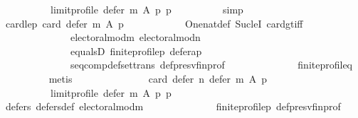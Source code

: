 \begin{isabellebody}
\ \ \ \ \ \ \ \ \ \ {\isacharparenleft}{\kern0pt}limit{\isacharunderscore}{\kern0pt}profile\ {\isacharparenleft}{\kern0pt}defer\ m\ A\ p{\isacharparenright}{\kern0pt}\ p{\isacharparenright}{\kern0pt}{\isachardoublequoteclose}\isanewline
\ \ \ \ \ \ \ \ \isamarkupfalse%
\ simp\isanewline
\ \ \ \ \ \ \isamarkupfalse%
\ card{\isacharunderscore}{\kern0pt}le{\isacharunderscore}{\kern0pt}{}{\isacharunderscore}{\kern0pt}p{\isacharcolon}{\kern0pt}\ {\isachardoublequoteopen}card\ {\isacharparenleft}{\kern0pt}defer\ m\ A\ p{\isacharparenright}{\kern0pt}\ {\isasymge}\ {}{\isachardoublequoteclose}\isanewline
\ \ \ \ \ \ \ \ \isamarkupfalse%
\ One{\isacharunderscore}{\kern0pt}nat{\isacharunderscore}{\kern0pt}def\ Suc{\isacharunderscore}{\kern0pt}leI\ card{\isacharunderscore}{\kern0pt}gt{\isacharunderscore}{\kern0pt}{}{\isacharunderscore}{\kern0pt}iff\isanewline
\ \ \ \ \ \ \ \ \ \ \ \ \ \ electoral{\isacharunderscore}{\kern0pt}mod{\isacharunderscore}{\kern0pt}m\ electoral{\isacharunderscore}{\kern0pt}mod{\isacharunderscore}{\kern0pt}n\isanewline
\ \ \ \ \ \ \ \ \ \ \ \ \ \ equals{}D\ finite{\isacharunderscore}{\kern0pt}profile{\isacharunderscore}{\kern0pt}p\ defer{\isacharunderscore}{\kern0pt}a{\isacharunderscore}{\kern0pt}p\isanewline
\ \ \ \ \ \ \ \ \ \ \ \ \ \ seq{\isacharunderscore}{\kern0pt}comp{\isacharunderscore}{\kern0pt}def{\isacharunderscore}{\kern0pt}set{\isacharunderscore}{\kern0pt}trans\ def{\isacharunderscore}{\kern0pt}presv{\isacharunderscore}{\kern0pt}fin{\isacharunderscore}{\kern0pt}prof\isanewline
\ \ \ \ \ \ \ \ \ \ \ \ \ \ finite{\isacharunderscore}{\kern0pt}profile{\isacharunderscore}{\kern0pt}q\isanewline
\ \ \ \ \ \ \ \ \isamarkupfalse%
\ metis\isanewline
\ \ \ \ \ \ \isamarkupfalse%
\isanewline
\ \ \ \ \ \ \ \ {\isachardoublequoteopen}card\ {\isacharparenleft}{\kern0pt}defer\ n\ {\isacharparenleft}{\kern0pt}defer\ m\ A\ p{\isacharparenright}{\kern0pt}\isanewline
\ \ \ \ \ \ \ \ \ \ {\isacharparenleft}{\kern0pt}limit{\isacharunderscore}{\kern0pt}profile\ {\isacharparenleft}{\kern0pt}defer\ m\ A\ p{\isacharparenright}{\kern0pt}\ p{\isacharparenright}{\kern0pt}{\isacharparenright}{\kern0pt}\ {\isacharequal}{\kern0pt}\ {}{\isachardoublequoteclose}\isanewline
\ \ \ \ \ \ \ \ \isamarkupfalse%
\ defers{\isacharunderscore}{\kern0pt}{}\ defers{\isacharunderscore}{\kern0pt}def\ electoral{\isacharunderscore}{\kern0pt}mod{\isacharunderscore}{\kern0pt}m\isanewline
\ \ \ \ \ \ \ \ \ \ \ \ \ \ finite{\isacharunderscore}{\kern0pt}profile{\isacharunderscore}{\kern0pt}p\ def{\isacharunderscore}{\kern0pt}presv{\isacharunderscore}{\kern0pt}fin{\isacharunderscore}{\kern0pt}prof\isanewline

\end{isabellebody}
